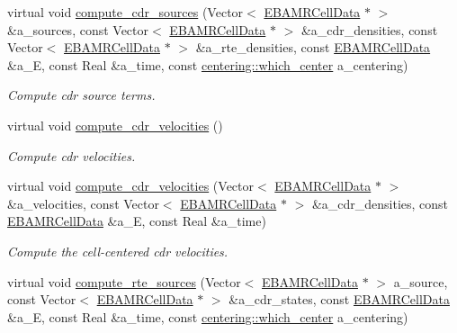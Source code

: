 \begin{DoxyCompactItemize}
virtual void \hyperlink{classtime__stepper_a8d068d4c6e7aee6e33e5df345a8b6fd9}{compute\+\_\+cdr\+\_\+sources} (Vector$<$ \hyperlink{type__definitions_8H_a7e610f301989e5e07781c5e338bdb7c3}{E\+B\+A\+M\+R\+Cell\+Data} $\ast$ $>$ \&a\+\_\+sources, const Vector$<$ \hyperlink{type__definitions_8H_a7e610f301989e5e07781c5e338bdb7c3}{E\+B\+A\+M\+R\+Cell\+Data} $\ast$ $>$ \&a\+\_\+cdr\+\_\+densities, const Vector$<$ \hyperlink{type__definitions_8H_a7e610f301989e5e07781c5e338bdb7c3}{E\+B\+A\+M\+R\+Cell\+Data} $\ast$ $>$ \&a\+\_\+rte\+\_\+densities, const \hyperlink{type__definitions_8H_a7e610f301989e5e07781c5e338bdb7c3}{E\+B\+A\+M\+R\+Cell\+Data} \&a\+\_\+E, const Real \&a\+\_\+time, const \hyperlink{namespacecentering_a2cba3891fbdab30a214ce001478b0c00}{centering\+::which\+\_\+center} a\+\_\+centering)
\begin{DoxyCompactList}\small\item\em Compute cdr source terms. \end{DoxyCompactList}\item 
virtual void \hyperlink{classtime__stepper_a417749a28f2243056e4aafa57b19b77b}{compute\+\_\+cdr\+\_\+velocities} ()
\begin{DoxyCompactList}\small\item\em Compute cdr velocities. \end{DoxyCompactList}\item 
virtual void \hyperlink{classtime__stepper_a549b3ddb60d7b4890f220c7616702ab9}{compute\+\_\+cdr\+\_\+velocities} (Vector$<$ \hyperlink{type__definitions_8H_a7e610f301989e5e07781c5e338bdb7c3}{E\+B\+A\+M\+R\+Cell\+Data} $\ast$ $>$ \&a\+\_\+velocities, const Vector$<$ \hyperlink{type__definitions_8H_a7e610f301989e5e07781c5e338bdb7c3}{E\+B\+A\+M\+R\+Cell\+Data} $\ast$ $>$ \&a\+\_\+cdr\+\_\+densities, const \hyperlink{type__definitions_8H_a7e610f301989e5e07781c5e338bdb7c3}{E\+B\+A\+M\+R\+Cell\+Data} \&a\+\_\+E, const Real \&a\+\_\+time)
\begin{DoxyCompactList}\small\item\em Compute the cell-\/centered cdr velocities. \end{DoxyCompactList}\item 
virtual void \hyperlink{classtime__stepper_aa14114d0dd6e48773f54e3f9f2fcfb73}{compute\+\_\+rte\+\_\+sources} (Vector$<$ \hyperlink{type__definitions_8H_a7e610f301989e5e07781c5e338bdb7c3}{E\+B\+A\+M\+R\+Cell\+Data} $\ast$ $>$ a\+\_\+source, const Vector$<$ \hyperlink{type__definitions_8H_a7e610f301989e5e07781c5e338bdb7c3}{E\+B\+A\+M\+R\+Cell\+Data} $\ast$ $>$ \&a\+\_\+cdr\+\_\+states, const \hyperlink{type__definitions_8H_a7e610f301989e5e07781c5e338bdb7c3}{E\+B\+A\+M\+R\+Cell\+Data} \&a\+\_\+E, const Real \&a\+\_\+time, const \hyperlink{namespacecentering_a2cba3891fbdab30a214ce001478b0c00}{centering\+::which\+\_\+center} a\+\_\+centering)

\end{DoxyCompactItemize}

